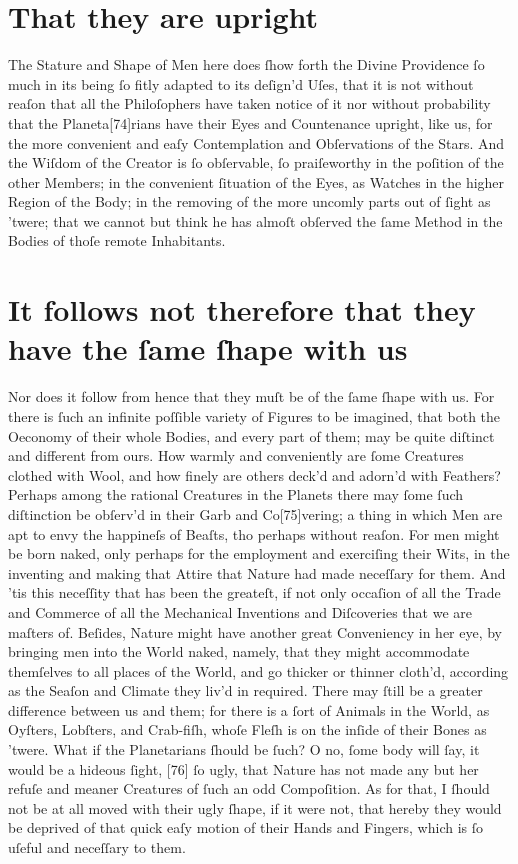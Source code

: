 \documentclass[letterpaper]{book}
\begin{document}
\section{That they are upright}

The Stature and Shape of Men here does ſhow forth the Divine Providence
ſo much in its being ſo fitly adapted to its deſign'd Uſes, that it is not
without reaſon that all the Philoſophers have taken notice of it nor without probability that the Planeta[74]rians have their Eyes and Countenance
upright, like us, for the more convenient and eaſy Contemplation and Obſervations of the Stars. And the Wiſdom of the Creator is ſo obſervable,
ſo praiſeworthy in the poſition of the other Members; in the convenient
ſituation of the Eyes, as Watches in the higher Region of the Body; in the
removing of the more uncomly parts out of ſight as 'twere; that we cannot
but think he has almoſt obſerved the ſame Method in the Bodies of thoſe
remote Inhabitants.


\section{It follows not therefore that they have the ſame ſhape with us} 

Nor does it follow from hence that they muſt be of the ſame ſhape with us.
For there is ſuch an infinite poſſible variety of Figures to be imagined,
that both the Oeconomy of their whole Bodies, and every part of them; may be
quite diſtinct and different from ours. How warmly and conveniently are ſome
Creatures clothed with Wool, and how finely are others deck'd and adorn'd
with Feathers? Perhaps among the rational Creatures in the Planets there may
ſome ſuch diſtinction be obſerv'd in their Garb and Co[75]vering; a thing in
which Men are apt to envy the happineſs of Beaſts, tho perhaps without
reaſon. For men might be born naked, only perhaps for the employment and
exerciſing their Wits, in the inventing and making that Attire that Nature
had made neceſſary for them. And 'tis this neceſſity that has been the
greateſt, if not only occaſion of all the Trade and Commerce of all the
Mechanical Inventions and Diſcoveries that we are maſters of. Beſides,
Nature might have another great Conveniency in her eye, by bringing men into
the World naked, namely, that they might accommodate themſelves to all
places of the World, and go thicker or thinner cloth'd, according as the
Seaſon and Climate they liv'd in required. There may ſtill be a greater difference between us and them; for there is a ſort of Animals in the World, as
Oyſters, Lobſters, and Crab-fiſh, whoſe Fleſh is on the inſide of their
Bones as 'twere. What if the Planetarians ſhould be ſuch? O no, ſome body
will ſay, it would be a hideous ſight, [76] ſo ugly, that Nature has not
made any but her refuſe and meaner Creatures of ſuch an odd Compoſition. As
for that, I ſhould not be at all moved with their ugly ſhape, if it were
not, that hereby they would be deprived of that quick eaſy motion of their
Hands and Fingers, which is ſo uſeful and neceſſary to them.
\end{document}
